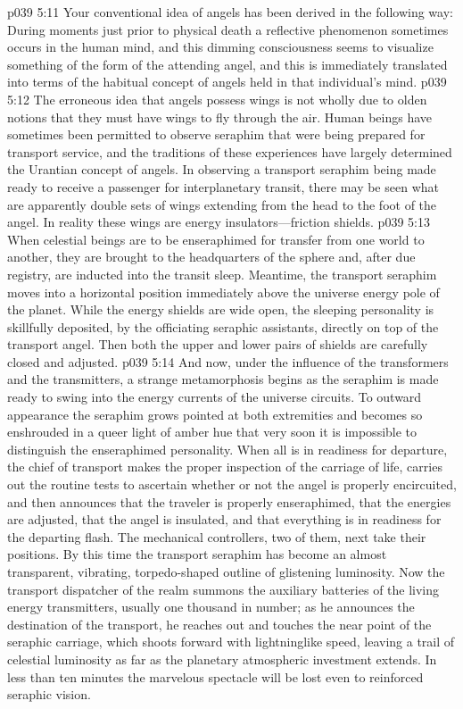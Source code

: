 \pc \vs p039 5:11 Your conventional idea of angels has been derived in the following way: During moments just prior to physical death a reflective phenomenon sometimes occurs in the human mind, and this dimming consciousness seems to visualize something of the form of the attending angel, and this is immediately translated into terms of the habitual concept of angels held in that individual’s mind.
\vs p039 5:12 The erroneous idea that angels possess wings is not wholly due to olden notions that they must have wings to fly through the air. Human beings have sometimes been permitted to observe seraphim that were being prepared for transport service, and the traditions of these experiences have largely determined the Urantian concept of angels. In observing a transport seraphim being made ready to receive a passenger for interplanetary transit, there may be seen what are apparently double sets of wings extending from the head to the foot of the angel. In reality these wings are energy insulators---friction shields.
\pc \vs p039 5:13 When celestial beings are to be enseraphimed for transfer from one world to another, they are brought to the headquarters of the sphere and, after due registry, are inducted into the transit sleep. Meantime, the transport seraphim moves into a horizontal position immediately above the universe energy pole of the planet. While the energy shields are wide open, the sleeping personality is skillfully deposited, by the officiating seraphic assistants, directly on top of the transport angel. Then both the upper and lower pairs of shields are carefully closed and adjusted.
\vs p039 5:14 And now, under the influence of the transformers and the transmitters, a strange metamorphosis begins as the seraphim is made ready to swing into the energy currents of the universe circuits. To outward appearance the seraphim grows pointed at both extremities and becomes so enshrouded in a queer light of amber hue that very soon it is impossible to distinguish the enseraphimed personality. When all is in readiness for departure, the chief of transport makes the proper inspection of the carriage of life, carries out the routine tests to ascertain whether or not the angel is properly encircuited, and then announces that the traveler is properly enseraphimed, that the energies are adjusted, that the angel is insulated, and that everything is in readiness for the departing flash. The mechanical controllers, two of them, next take their positions. By this time the transport seraphim has become an almost transparent, vibrating, torpedo\hyp{}shaped outline of glistening luminosity. Now the transport dispatcher of the realm summons the auxiliary batteries of the living energy transmitters, usually one thousand in number; as he announces the destination of the transport, he reaches out and touches the near point of the seraphic carriage, which shoots forward with lightninglike speed, leaving a trail of celestial luminosity as far as the planetary atmospheric investment extends. In less than ten minutes the marvelous spectacle will be lost even to reinforced seraphic vision.
